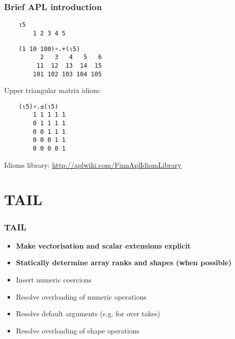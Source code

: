 \documentclass{beamer}
\begin{document}
\begin{frame}[fragile]
\frametitle{Brief APL introduction}

\begin{verbatim}
    ⍳5
        1 2 3 4 5
\end{verbatim}

\begin{verbatim}
    (1 10 100)∘.+(⍳5)
          2   3   4   5   6
         11  12  13  14  15
        101 102 103 104 105
\end{verbatim}

\pause
Upper triangular matrix idiom:
\begin{verbatim}
    (⍳5)∘.≤(⍳5)
        1 1 1 1 1
        0 1 1 1 1
        0 0 1 1 1
        0 0 0 1 1
        0 0 0 0 1
\end{verbatim}


\pause
Idioms library: \url{http://aplwiki.com/FinnAplIdiomLibrary}

\end{frame}

\section{TAIL}

\begin{frame}
\frametitle{TAIL}

  \begin{itemize}
  \item \textbf{Make vectorisation and scalar extensions explicit}
  \item \textbf{Statically determine array ranks and shapes (when possible)}
  \item Insert numeric coercions
  \item Resolve overloading of numeric operations
  \item Resolve %
    default arguments
    (e.g. for over takes)
  \item Resolve overloading of shape operations
  \end{itemize}

\end{frame}
\end{document}
